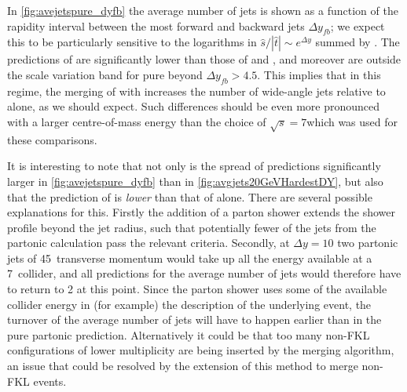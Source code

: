 In \cref{fig:avejetspure_dyfb} the average number of jets is shown as a function 
of the rapidity interval between the most forward and backward jets $\Delta y_{fb}$;
we expect this to be particularly sensitive to the logarithms in $\hat s/|\hat t| \sim e^{\Delta y}$
summed by \HEJ.
The predictions of \py are significantly lower than those of \HEJ and
\HEJpy, and moreover are outside the scale variation band for pure
\HEJ beyond $\Delta y_{fb}>4.5$. This implies that in this regime, the 
merging of \HEJ with \py increases the number of wide-angle jets relative to \py alone,
as we should expect.  Such differences should be even more pronounced
with a larger centre-of-mass energy than the choice of $\sqrt{s} =7$\TeV which was used for these
comparisons.


It is interesting to note that not only is the spread of predictions 
significantly larger in \cref{fig:avejetspure_dyfb} than in \cref{fig:avgjets20GeVHardestDY},
but also that the prediction of \HEJpy is
\emph{lower} than that of \HEJ alone.
There are several possible explanations for this. 
Firstly the addition of a parton shower extends the shower profile beyond the
jet radius, such that potentially fewer of the jets from the partonic calculation
pass the relevant criteria.
Secondly, at $\Delta y=10$ two partonic
jets of 45\GeV\ transverse momentum would take up all the energy available at
a 7\TeV\ collider, and all predictions for the average number of jets would
therefore have to return to 2 at this point. Since the parton shower uses some of
the available collider energy in (for example) the description of the underlying event,
the turnover of the average number of jets will have to happen
earlier than in the pure partonic prediction.
Alternatively it could be that too many non-FKL configurations of lower multiplicity are being inserted by
the merging algorithm, an issue that could be resolved by the extension of this method
to merge non-FKL events.


